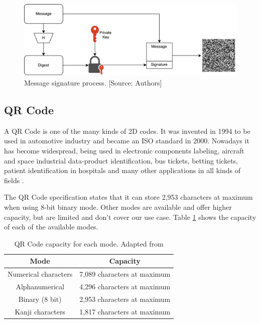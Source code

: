 \documentclass[12pt]{article}
\begin{document}
\begin{figure}[ht]
    \centering
    \includegraphics[width=.8\textwidth]{signing.pdf}
    \caption{Message signature process. [Source: Authors]}
    \label{fig:signature}
\end{figure}

\subsection{QR Code}

A QR Code is one of the many kinds of 2D codes. It was invented in 1994 to be used in automotive industry and became an ISO standard in 2000. Nowadays it has become widespread, being used in electronic components labeling, aircraft and space industrial data-product identification, bus tickets, betting tickets, patient identification in hospitals and many other applications in all kinds of fields \cite{soon2008qr}.

The QR Code specification states that it can store 2,953 characters at maximum when using 8-bit binary mode. Other modes are available and offer higher capacity, but are limited and don't cover our use case. Table \ref{tab:capacity} shows the capacity of each of the available modes.

\begin{table}[ht]
\centering
\caption{QR Code capacity for each mode. Adapted from \cite{soon2008qr}}
\label{tab:capacity}
\begin{tabular}{|c|c|}
\hline
\textbf{Mode}        & \textbf{Capacity}           \\ \hline
Numerical characters & 7,089 characters at maximum \\ \hline
Alphanumerical       & 4,296 characters at maximum \\ \hline
Binary (8 bit)       & 2,953 characters at maximum \\ \hline
Kanji characters     & 1,817 characters at maximum \\ \hline
\end{tabular}
\end{table}
\end{document}
